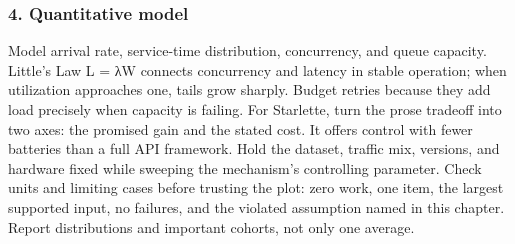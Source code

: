 \subsubsection*{4. Quantitative model}
Model arrival rate, service-time distribution, concurrency, and queue capacity. Little's Law L = λW connects concurrency and latency in stable operation; when utilization approaches one, tails grow sharply. Budget retries because they add load precisely when capacity is failing.
For Starlette, turn the prose tradeoff into two axes: the promised gain and the stated cost. It offers control with fewer batteries than a full API framework. Hold the dataset, traffic mix, versions, and hardware fixed while sweeping the mechanism's controlling parameter.
Check units and limiting cases before trusting the plot: zero work, one item, the largest supported input, no failures, and the violated assumption named in this chapter. Report distributions and important cohorts, not only one average.
